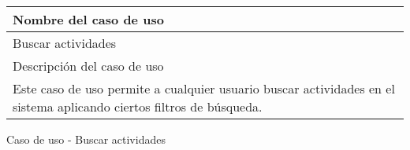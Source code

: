 \begin{identificacionCasoDeUso}
	\begin{tabular} { | p{17cm} | }
		\hline
		Nombre del caso de uso                                                                                               \\ \hline
		Buscar actividades                                                                                                   \\ \hline
		Descripción del caso de uso                                                                                          \\ \hline
		Este caso de uso permite a cualquier usuario buscar actividades en el sistema aplicando ciertos filtros de búsqueda. \\ \hline
	\end{tabular}
	\caption{Caso de uso - Buscar actividades}
\end{identificacionCasoDeUso}